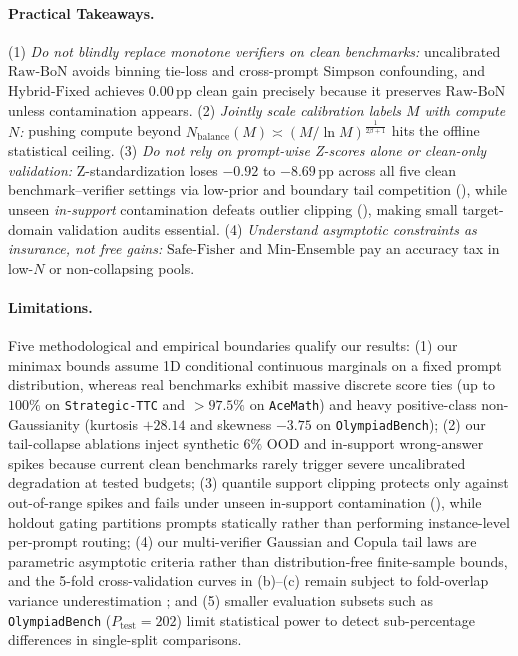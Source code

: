 \documentclass[10pt]{article}
\theoremstyle{plain}
\theoremstyle{definition}
\theoremstyle{remark}
\begin{document}
\paragraph{Practical Takeaways.}
(1) \emph{Do not blindly replace monotone verifiers on clean benchmarks:} uncalibrated $\mathrm{Raw\text{-}BoN}$ avoids binning tie-loss and cross-prompt Simpson confounding, and $\mathrm{Hybrid\text{-}Fixed}$ achieves $0.00\,\mathrm{pp}$ clean gain precisely because it preserves $\mathrm{Raw\text{-}BoN}$ unless contamination appears.
(2) \emph{Jointly scale calibration labels $M$ with compute $N$:} pushing compute beyond $N_{\mathrm{balance}}(M) \asymp (M/\ln M)^{\frac{1}{2\beta+1}}$ hits the offline statistical ceiling.
(3) \emph{Do not rely on prompt-wise Z-scores alone or clean-only validation:} Z-standardization loses $-0.92$ to $-8.69\,\mathrm{pp}$ across all five clean benchmark--verifier settings via low-prior and boundary tail competition (), while unseen \emph{in-support} contamination defeats outlier clipping (), making small target-domain validation audits essential.
(4) \emph{Understand asymptotic constraints as insurance, not free gains:} $\mathrm{Safe\text{-}Fisher}$ and $\mathrm{Min\text{-}Ensemble}$ pay an accuracy tax in low-$N$ or non-collapsing pools.

\paragraph{Limitations.}
Five methodological and empirical boundaries qualify our results: (1) our minimax bounds assume 1D conditional continuous marginals on a fixed prompt distribution, whereas real benchmarks exhibit massive discrete score ties (up to $100\%$ on \texttt{Strategic-TTC} and $>97.5\%$ on \texttt{AceMath}) and heavy positive-class non-Gaussianity (kurtosis $+28.14$ and skewness $-3.75$ on \texttt{OlympiadBench}); (2) our tail-collapse ablations inject synthetic $6\%$ OOD and in-support wrong-answer spikes because current clean benchmarks rarely trigger severe uncalibrated degradation at tested budgets; (3) quantile support clipping protects only against out-of-range spikes and fails under unseen in-support contamination (), while holdout gating partitions prompts statically rather than performing instance-level per-prompt routing; (4) our multi-verifier Gaussian and Copula tail laws are parametric asymptotic criteria rather than distribution-free finite-sample bounds, and the 5-fold cross-validation curves in (b)--(c) remain subject to fold-overlap variance underestimation \citep{nadeau2003inference}; and (5) smaller evaluation subsets such as \texttt{OlympiadBench} ($P_{\mathrm{test}}=202$) limit statistical power to detect sub-percentage differences in single-split comparisons.
\end{document}
